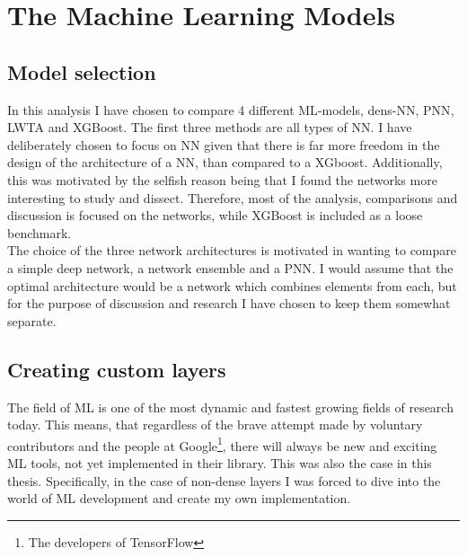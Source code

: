 \section{The Machine Learning Models}
\subsection{Model selection}
In this analysis I have chosen to compare 4 different \ac{ML}-models, dens-\acf{NN}, \acf{PNN},
\ac{LWTA} and XGBoost. The first three methods are all types of \ac{NN}. I have deliberately 
chosen to focus on \ac{NN} given that there is far more freedom in the design of the architecture
of a \ac{NN}, than compared to a XGboost. Additionally, this was motivated by the selfish reason
being that I found the networks more interesting to study and dissect. Therefore, most of the 
analysis, comparisons and discussion is focused on the networks, while XGBoost is included 
as a loose benchmark. 
\\
The choice of the three network architectures is motivated in wanting to compare a simple 
deep network, a network ensemble and a \ac{PNN}. I would assume that the optimal architecture
would be a network which combines elements from each, but for the purpose of discussion
and research I have chosen to keep them somewhat separate. 
\subsection{Creating custom layers}\label{subsec:CustomLayer}
The field of \ac{ML} is one of the most dynamic and fastest growing fields of research
today. This means, that regardless of the brave attempt made by voluntary contributors and
the people at Google\footnote{The developers of TensorFlow}, there will always be 
new and exciting \ac{ML} tools, not yet implemented in their library. This was also 
the case in this thesis. Specifically, in the case of non-dense layers I was forced
to dive into the world of \ac{ML} development and create my own implementation. 
